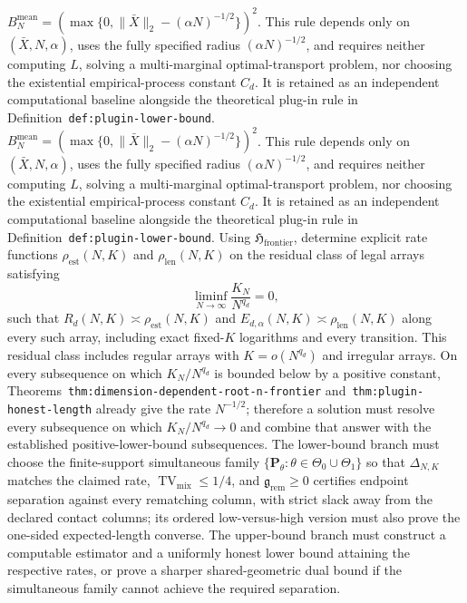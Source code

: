 \(B_N^{\mathrm{mean}}=(\max\{0,\|\bar X\|_2-(\alpha N)^{-1/2}\})^2\). This rule depends only on \((\bar X,N,\alpha)\), uses the fully specified radius \((\alpha N)^{-1/2}\), and requires neither computing \(\widehat L\), solving a multi-marginal optimal-transport problem, nor choosing the existential empirical-process constant \(C_d\). It is retained as an independent computational baseline alongside the theoretical plug-in rule in Definition~\texttt{def:plugin-lower-bound}.
\(B_N^{\mathrm{mean}}=(\max\{0,\|\bar X\|_2-(\alpha N)^{-1/2}\})^2\). This rule depends only on \((\bar X,N,\alpha)\), uses the fully specified radius \((\alpha N)^{-1/2}\), and requires neither computing \(\widehat L\), solving a multi-marginal optimal-transport problem, nor choosing the existential empirical-process constant \(C_d\). It is retained as an independent computational baseline alongside the theoretical plug-in rule in Definition~\texttt{def:plugin-lower-bound}.
Using \(\mathfrak H_{\mathrm{frontier}}\), determine explicit rate functions \(\rho_{\mathrm{est}}(N,K)\) and \(\rho_{\mathrm{len}}(N,K)\) on the residual class of legal arrays satisfying
\[
\liminf_{N\to\infty}\frac{K_N}{N^{q_d}}=0,
\]
such that \(R_d(N,K)\asymp\rho_{\mathrm{est}}(N,K)\) and \(E_{d,\alpha}(N,K)\asymp\rho_{\mathrm{len}}(N,K)\) along every such array, including exact fixed-\(K\) logarithms and every transition. This residual class includes regular arrays with \(K=o(N^{q_d})\) and irregular arrays. On every subsequence on which \(K_N/N^{q_d}\) is bounded below by a positive constant, Theorems~\texttt{thm:dimension-dependent-root-n-frontier} and~\texttt{thm:plugin-honest-length} already give the rate \(N^{-1/2}\); therefore a solution must resolve every subsequence on which \(K_N/N^{q_d}\to0\) and combine that answer with the established positive-lower-bound subsequences. The lower-bound branch must choose the finite-support simultaneous family \(\{\mathbf P_\theta:\theta\in\Theta_0\cup\Theta_1\}\) so that \(\Delta_{N,K}\) matches the claimed rate, \(\operatorname{TV}_{\mathrm{mix}}\le1/4\), and \(\mathfrak g_{\mathrm{rem}}\ge0\) certifies endpoint separation against every rematching column, with strict slack away from the declared contact columns; its ordered low-versus-high version must also prove the one-sided expected-length converse. The upper-bound branch must construct a computable estimator and a uniformly honest lower bound attaining the respective rates, or prove a sharper shared-geometric dual bound if the simultaneous family cannot achieve the required separation.
